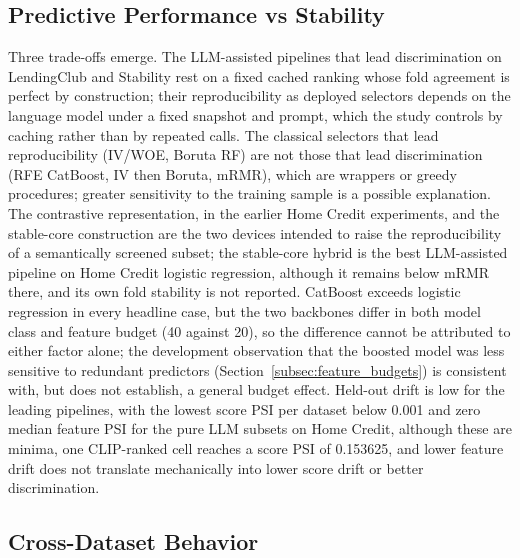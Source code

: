 \documentclass[final,5p,twocolumn]{elsarticle}
\begin{document}
\subsection{Predictive Performance vs Stability}
\label{subsec:performance_vs_stability}

Three trade-offs emerge. The LLM-assisted pipelines that lead discrimination on LendingClub and Stability rest on a fixed cached ranking whose fold agreement is perfect by construction; their reproducibility as deployed selectors depends on the language model under a fixed snapshot and prompt, which the study controls by caching rather than by repeated calls. The classical selectors that lead reproducibility (IV/WOE, Boruta RF) are not those that lead discrimination (RFE CatBoost, IV then Boruta, mRMR), which are wrappers or greedy procedures; greater sensitivity to the training sample is a possible explanation. The contrastive representation, in the earlier Home Credit experiments, and the stable-core construction are the two devices intended to raise the reproducibility of a semantically screened subset; the stable-core hybrid is the best LLM-assisted pipeline on Home Credit logistic regression, although it remains below mRMR there, and its own fold stability is not reported. CatBoost exceeds logistic regression in every headline case, but the two backbones differ in both model class and feature budget (40 against 20), so the difference cannot be attributed to either factor alone; the development observation that the boosted model was less sensitive to redundant predictors (Section~\ref{subsec:feature_budgets}) is consistent with, but does not establish, a general budget effect. Held-out drift is low for the leading pipelines, with the lowest score PSI per dataset below 0.001 and zero median feature PSI for the pure LLM subsets on Home Credit, although these are minima, one CLIP-ranked cell reaches a score PSI of 0.153625, and lower feature drift does not translate mechanically into lower score drift or better discrimination.

\subsection{Cross-Dataset Behavior}
\label{subsec:cross_dataset}
\end{document}
